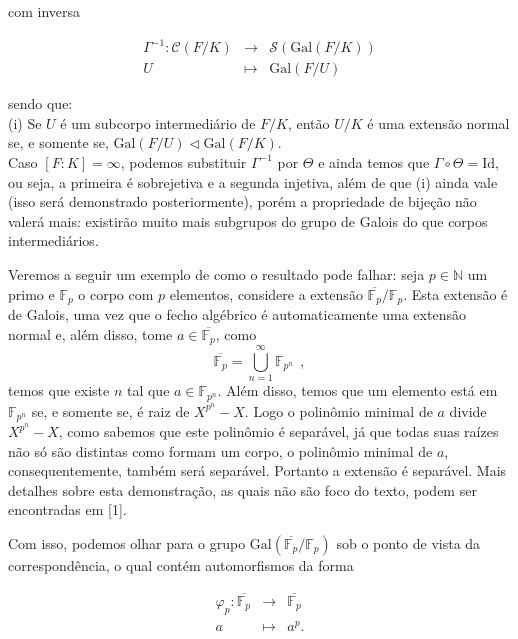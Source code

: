 \documentclass[12pt,a4paper]{article}
\theoremstyle{definition}
\begin{document}
com inversa

$$\begin{array}{rcl}
   \Gamma^{-1}: \mathcal{C}(F/K)   & \rightarrow &  \mathcal{S}( \text{Gal}(F/K)) \\
     U & \mapsto & \text{Gal}(F/U) 
\end{array}$$

sendo que:  \\

(i) Se $U$ é um subcorpo intermediário de $F/K$, então $U/K$ é uma extensão normal se, e somente se, $ \text{Gal}(F/U)\triangleleft \text{Gal}(F/K) $. \\

 Caso $[F : K]=\infty$, podemos substituir $\Gamma^{-1}$ por $\Theta$ e ainda temos que $\Gamma \circ \Theta = \text{Id}$, ou seja, a primeira é sobrejetiva e a segunda injetiva, além de que (i) ainda vale (isso será demonstrado posteriormente), porém a propriedade de bijeção não valerá mais: existirão muito mais subgrupos do grupo de Galois do que corpos intermediários. 

Veremos a seguir um exemplo de como o resultado pode falhar: seja $p\in \mathbb{N}$ um primo e $\mathbb{F}_p$ o corpo com $p$ elementos, considere a extensão $\overline{\mathbb{F}_p}/\mathbb{F}_p$. Esta extensão é de Galois, uma vez que o fecho algébrico é automaticamente uma extensão normal e, além disso, tome $a\in\overline{\mathbb{F}_p}$, como  $$\overline{\mathbb{F}_p}=\bigcup_{n=1}^\infty \mathbb{F}_{p^n} \ \ ,$$ temos que existe $n$ tal que $a\in \mathbb{F}_{p^n}$. Além disso, temos que um elemento está em $\mathbb{F}_{p^n}$ se, e somente se, é raiz de $X^{p^n}-X$. Logo o polinômio minimal de $a$ divide $X^{p^n}-X$, como sabemos que este polinômio é separável, já que todas suas raízes não só são distintas como formam um corpo, o polinômio minimal de $a$, consequentemente, também será separável. Portanto a extensão é separável. Mais detalhes sobre esta demonstração, as quais não são foco do texto, podem ser encontradas em [1]. 

Com isso, podemos olhar para o grupo $\text{Gal}(\overline{\mathbb{F}_p}/\mathbb{F}_p)$ sob o ponto de vista da correspondência, o qual contém automorfismos da forma 

$$\begin{array}{rcl}
  \varphi_p: \overline{\mathbb{F}_p}   & \longrightarrow &  \overline{\mathbb{F}_p} \\
     a & \longmapsto & a^p. 
\end{array}$$
\end{document}
